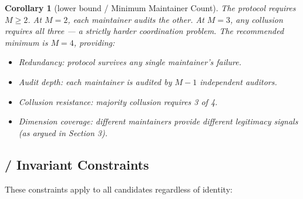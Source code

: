 \documentclass[12pt,a4paper]{article}
\newtheorem{corollary}[theorem]{Corollary}
\theoremstyle{remark}
\newcommand{\numMaintainers}{M}
\begin{document}
\begin{corollary}[lower bound / Minimum Maintainer Count]
\label{cor:min-maintainers}
The protocol requires $\numMaintainers \geq 2$. At $\numMaintainers = 2$,
each maintainer audits the other. At $\numMaintainers = 3$, any collusion
requires all three — a strictly harder coordination problem. The
recommended minimum is $\numMaintainers = 4$, providing:
\begin{itemize}[leftmargin=*]
    \item Redundancy: protocol survives any single maintainer's failure.
    \item Audit depth: each maintainer is audited by $\numMaintainers - 1$
          independent auditors.
    \item Collusion resistance: majority collusion requires 3 of 4.
    \item Dimension coverage: different maintainers provide different
          legitimacy signals (as argued in Section 3).
\end{itemize}
\end{corollary}

\subsection{ / Invariant Constraints}

These constraints apply to all candidates regardless of identity:
\end{document}
